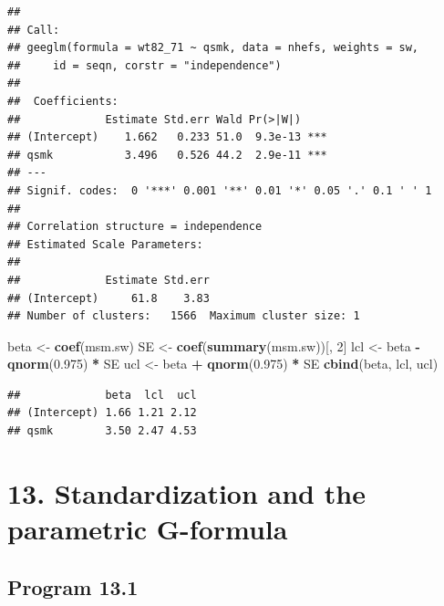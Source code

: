 \documentclass[
  10pt,
]{book}
\newenvironment{Shaded}{\begin{snugshade}}{\end{snugshade}}
\newcommand{\DecValTok}[1]{\textcolor[rgb]{0.00,0.00,0.81}{#1}}
\newcommand{\FloatTok}[1]{\textcolor[rgb]{0.00,0.00,0.81}{#1}}
\newcommand{\KeywordTok}[1]{\textcolor[rgb]{0.13,0.29,0.53}{\textbf{#1}}}
\newcommand{\NormalTok}[1]{#1}
\newcommand{\OperatorTok}[1]{\textcolor[rgb]{0.81,0.36,0.00}{\textbf{#1}}}
\newcommand{\StringTok}[1]{\textcolor[rgb]{0.31,0.60,0.02}{#1}}
\begin{document}
\begin{verbatim}
## 
## Call:
## geeglm(formula = wt82_71 ~ qsmk, data = nhefs, weights = sw, 
##     id = seqn, corstr = "independence")
## 
##  Coefficients:
##             Estimate Std.err Wald Pr(>|W|)    
## (Intercept)    1.662   0.233 51.0  9.3e-13 ***
## qsmk           3.496   0.526 44.2  2.9e-11 ***
## ---
## Signif. codes:  0 '***' 0.001 '**' 0.01 '*' 0.05 '.' 0.1 ' ' 1
## 
## Correlation structure = independence 
## Estimated Scale Parameters:
## 
##             Estimate Std.err
## (Intercept)     61.8    3.83
## Number of clusters:   1566  Maximum cluster size: 1
\end{verbatim}

\begin{Shaded}
\begin{Highlighting}[]
\NormalTok{beta \textless{}{-}}\StringTok{ }\KeywordTok{coef}\NormalTok{(msm.sw)}
\NormalTok{SE \textless{}{-}}\StringTok{ }\KeywordTok{coef}\NormalTok{(}\KeywordTok{summary}\NormalTok{(msm.sw))[, }\DecValTok{2}\NormalTok{]}
\NormalTok{lcl \textless{}{-}}\StringTok{ }\NormalTok{beta }\OperatorTok{{-}}\StringTok{ }\KeywordTok{qnorm}\NormalTok{(}\FloatTok{0.975}\NormalTok{) }\OperatorTok{*}\StringTok{ }\NormalTok{SE}
\NormalTok{ucl \textless{}{-}}\StringTok{ }\NormalTok{beta }\OperatorTok{+}\StringTok{ }\KeywordTok{qnorm}\NormalTok{(}\FloatTok{0.975}\NormalTok{) }\OperatorTok{*}\StringTok{ }\NormalTok{SE}
\KeywordTok{cbind}\NormalTok{(beta, lcl, ucl)}
\end{Highlighting}
\end{Shaded}

\begin{verbatim}
##             beta  lcl  ucl
## (Intercept) 1.66 1.21 2.12
## qsmk        3.50 2.47 4.53
\end{verbatim}

\hypertarget{standardization-and-the-parametric-g-formula}{%
\chapter*{13. Standardization and the parametric G-formula}\label{standardization-and-the-parametric-g-formula}}

\hypertarget{program-13.1}{%
\section{Program 13.1}\label{program-13.1}}
\end{document}
